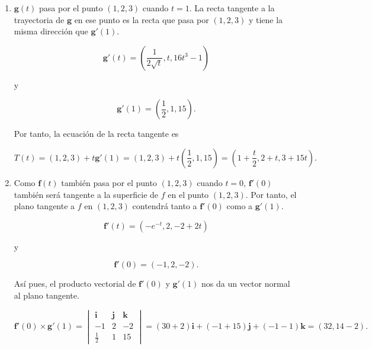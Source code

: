 \documentclass[
  spanish,
  a4paper,
]{scrreport}
\theoremstyle{definition}
\theoremstyle{remark}
\begin{document}
\begin{tcolorbox}[enhanced jigsaw, arc=.35mm, bottomrule=.15mm, bottomtitle=1mm, breakable, colback=white, colbacktitle=quarto-callout-tip-color!10!white, colframe=quarto-callout-tip-color-frame, coltitle=black, left=2mm, leftrule=.75mm, opacityback=0, opacitybacktitle=0.6, rightrule=.15mm, title=\textcolor{quarto-callout-tip-color}{\faLightbulb}\hspace{0.5em}{Solución}, titlerule=0mm, toprule=.15mm, toptitle=1mm]

\begin{enumerate}
\def\labelenumi{\alph{enumi}.}
\item
  \(\mathbf{g}(t)\) pasa por el punto \((1,2,3)\) cuando \(t=1\). La
  recta tangente a la trayectoria de \(\mathbf{g}\) en ese punto es la
  recta que pasa por \((1,2,3)\) y tiene la misma dirección que
  \(\mathbf{g}'(1)\).

  \[
  \mathbf{g}'(t) = \left(\frac{1}{2\sqrt{t}}, t, 16t^3-1\right)
  \]

  y

  \[
  \mathbf{g}'(1) = \left(\frac{1}{2}, 1, 15\right).
  \]

  Por tanto, la ecuación de la recta tangente es

  \[
  T(t) 
  = (1,2,3) + t \mathbf{g}'(1)
  = (1,2,3) + t \left(\frac{1}{2}, 1, 15\right)
  = \left(1+\frac{t}{2}, 2+t, 3+15t\right).
  \]
\item
  Como \(\mathbf{f}(t)\) también pasa por el punto \((1,2,3)\) cuando
  \(t=0\), \(\mathbf{f}'(0)\) también será tangente a la superficie de
  \(f\) en el punto \((1,2,3)\). Por tanto, el plano tangente a \(f\) en
  \((1,2,3)\) contendrá tanto a \(\mathbf{f}'(0)\) como a
  \(\mathbf{g}'(1)\).

  \[
  \mathbf{f}'(t) = (-e^{-t}, 2, -2+2t)
  \]

  y

  \[
  \mathbf{f}'(0) = (-1, 2, -2).
  \]

  Así pues, el producto vectorial de \(\mathbf{f}'(0)\) y
  \(\mathbf{g}'(1)\) nos da un vector normal al plano tangente.

  \[
  \mathbf{f}'(0) \times \mathbf{g}'(1) 
  = \begin{vmatrix}
  \mathbf{i} & \mathbf{j} & \mathbf{k} \\
  -1 & 2 & -2 \\
  \frac{1}{2} & 1 & 15
  \end{vmatrix}
  = (30 + 2)\mathbf{i} + (-1+ 15)\mathbf{j} + (- 1 - 1)\mathbf{k}
  = (32,14-2).
  \]


\end{enumerate}
\end{tcolorbox}
\end{document}
